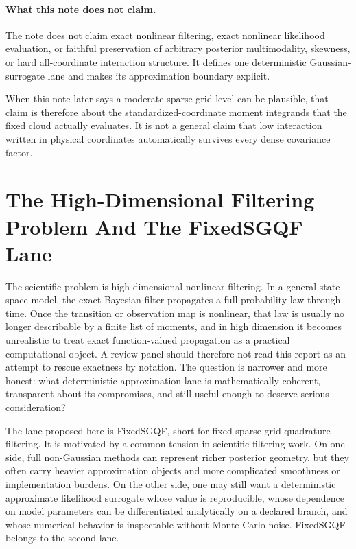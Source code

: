 \documentclass[11pt]{article}
\numberwithin{equation}{section}
\begin{document}
\paragraph{What this note does not claim.}
The note does not claim exact nonlinear filtering, exact nonlinear likelihood
evaluation, or faithful preservation of arbitrary posterior multimodality,
skewness, or hard all-coordinate interaction structure.  It defines one
deterministic Gaussian-surrogate lane and makes its approximation boundary
explicit.

When this note later says a moderate sparse-grid level can be plausible, that
claim is therefore about the standardized-coordinate moment integrands that the
fixed cloud actually evaluates.  It is not a general claim that low interaction
written in physical coordinates automatically survives every dense covariance
factor.

\tableofcontents

\section{The High-Dimensional Filtering Problem And The FixedSGQF Lane}
\label{sec:p32-problem-lane}

The scientific problem is high-dimensional nonlinear filtering.  In a general
state-space model, the exact Bayesian filter propagates a full probability law
through time.  Once the transition or observation map is nonlinear, that law is
usually no longer describable by a finite list of moments, and in high
dimension it becomes unrealistic to treat exact function-valued propagation as a
practical computational object.  A review panel should therefore not read this
report as an attempt to rescue exactness by notation.  The question is narrower
and more honest: what deterministic approximation lane is mathematically
coherent, transparent about its compromises, and still useful enough to deserve
serious consideration?

The lane proposed here is FixedSGQF, short for fixed sparse-grid quadrature
filtering.  It is motivated by a common tension in scientific filtering work.
On one side, full non-Gaussian methods can represent richer posterior geometry,
but they often carry heavier approximation objects and more complicated
smoothness or implementation burdens.  On the other side, one may still want a
deterministic approximate likelihood surrogate whose value is reproducible, whose
dependence on model parameters can be differentiated analytically on a declared
branch, and whose numerical behavior is inspectable without Monte Carlo noise.
FixedSGQF belongs to the second lane.
\end{document}

